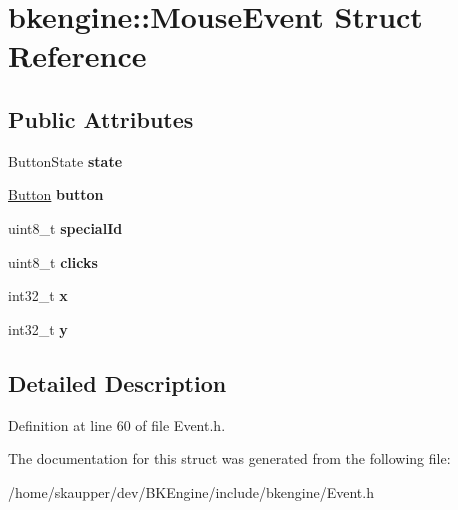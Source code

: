 \hypertarget{structbkengine_1_1MouseEvent}{}\section{bkengine\+:\+:Mouse\+Event Struct Reference}
\label{structbkengine_1_1MouseEvent}
\subsection*{Public Attributes}
\begin{DoxyCompactItemize}
\item 
\mbox{\label{structbkengine_1_1MouseEvent_a51bf4f34bfa583e1acc1e965c679e756}} 
Button\+State {\bfseries state}
\item 
\mbox{\label{structbkengine_1_1MouseEvent_a457e37469e0597b948807170c92ba00a}} 
\hyperlink{classbkengine_1_1Button}{Button} {\bfseries button}
\item 
\mbox{\label{structbkengine_1_1MouseEvent_a21daf4afc3b01eca82c3e9e8d9793a96}} 
uint8\+\_\+t {\bfseries special\+Id}
\item 
\mbox{\label{structbkengine_1_1MouseEvent_ab55f73804c2ecb46c50b0280657e66a7}} 
uint8\+\_\+t {\bfseries clicks}
\item 
\mbox{\label{structbkengine_1_1MouseEvent_ada1093c3192154b191eb555765f34394}} 
int32\+\_\+t {\bfseries x}
\item 
\mbox{\label{structbkengine_1_1MouseEvent_a15989b690b7b597e86b66ccbd057b51d}} 
int32\+\_\+t {\bfseries y}
\end{DoxyCompactItemize}


\subsection{Detailed Description}


Definition at line 60 of file Event.\+h.



The documentation for this struct was generated from the following file\+:\begin{DoxyCompactItemize}
\item 
/home/skaupper/dev/\+B\+K\+Engine/include/bkengine/Event.\+h\end{DoxyCompactItemize}
